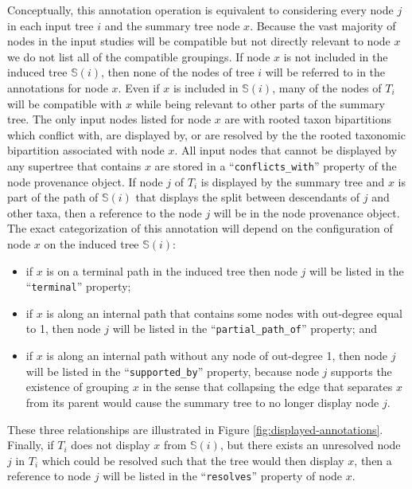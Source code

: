\documentclass[fleqn,12pt,lineno,english]{wlpeerj}
\newcommand{\supportedby}{\texttt{supported\_by}}
\newcommand{\partialpathof}{\texttt{partial\_path\_of}}
\newcommand{\terminal}{\texttt{terminal}}
\newcommand{\conflictswith}{\texttt{conflicts\_with}}
\newcommand{\resolves}{\texttt{resolves}}
\begin{document}
Conceptually, this annotation operation is equivalent to considering
every node $j$ in each input tree $i$ and the summary tree node
$x$. Because the vast majority of nodes in the input studies will
be compatible but not directly relevant to node $x$ we do not list
all of the compatible groupings. If node $x$ is not included in the
induced tree $\mathcal{\mathbb{S}}(i)$, then none of the nodes of
tree $i$ will be referred to in the annotations for node $x$. Even
if $x$ is included in $\mathcal{\mathbb{S}}(i)$, many of the nodes
of $T_{i}$ will be compatible with $x$ while being relevant to other
parts of the summary tree. The only input nodes listed for node $x$
are with rooted taxon bipartitions which conflict with, are displayed
by, or are resolved by the the rooted taxonomic bipartition associated
with node $x$. All input nodes that cannot be displayed by any supertree
that contains $x$ are stored in a ``\conflictswith{}'' property
of the node provenance object. If node $j$ of $T_{i}$ is displayed
by the summary tree and $x$ is part of the path of $\mathcal{\mathbb{S}}(i)$
that displays the split between descendants of $j$ and other taxa,
then a reference to the node $j$ will be in the node provenance object.
The exact categorization of this annotation will depend on the configuration
of node $x$ on the induced tree $\mathcal{\mathbb{S}}(i)$:
\begin{itemize}
\item if $x$ is on a terminal path in the induced tree then node $j$ will
be listed in the ``\terminal{}'' property;
\item if $x$ is along an internal path that contains some nodes with out-degree
equal to 1, then node $j$ will be listed in the ``\partialpathof{}''
property; and
\item if $x$ is along an internal path without any node of out-degree 1,
then node $j$ will be listed in the ``\supportedby{}'' property,
because node $j$ supports the existence of grouping $x$ in the sense
that collapsing the edge that separates $x$ from its parent would
cause the summary tree to no longer display node $j$.
\end{itemize}
These three relationships are illustrated in Figure \ref{fig:displayed-annotations}.
Finally, if $T_{i}$ does not display $x$ from $\mathcal{\mathbb{S}}(i)$,
but there exists an unresolved node $j$ in $T_{i}$ which could be
resolved such that the tree would then display $x$, then a reference
to node $j$ will be listed in the ``\resolves{}'' property of node
$x$. 
\end{document}

